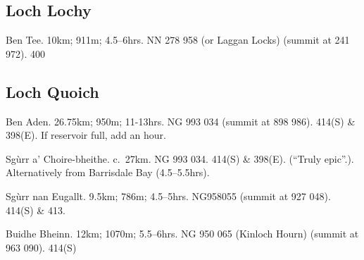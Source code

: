 

\subsection{Loch Lochy}

\begin{munros}
\item
Ben Tee.  10km; 911m; 4.5--6hrs.    NN 278 958 (or Laggan Locks) (summit at
241 972).  400
\end{munros}


\subsection{Loch Quoich}

\begin{munros}
\item\target
Ben Aden.  26.75km; 950m; 11-13hrs.  NG 993 034 (summit at 898 986).  414(S) \&
398(E).  If reservoir full, add an hour.

\item\target Sgùrr a' Choire-bheithe.  c.~27km.  NG 993 034.  414(S) \&
  398(E). (``Truly epic''.).  Alternatively from Barrisdale Bay (4.5--5.5hrs).

\item
Sgùrr nan Eugallt.  9.5km; 786m; 4.5--5hrs.  NG958055 (summit at 927 048).
414(S) \& 413.

\item
Buidhe Bheinn.  12km; 1070m; 5.5--6hrs.  NG 950 065 (Kinloch Hourn) (summit at
963 090).  414(S)
\end{munros}
